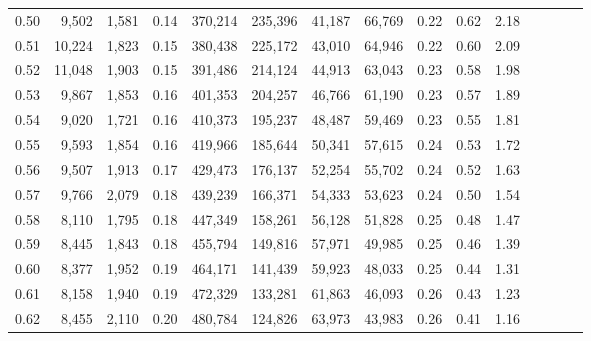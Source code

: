 \begin{tabular}{rrrcrrrrrrrrrrr}
0.50 &   9,502 &  1,581 &                                       0.14 &  370,214 &  235,396 &   41,187 &   66,769 &  0.22 &  0.62 &                         2.18 \\
0.51 &  10,224 &  1,823 &                                       0.15 &  380,438 &  225,172 &   43,010 &   64,946 &  0.22 &  0.60 &                         2.09 \\
0.52 &  11,048 &  1,903 &                                       0.15 &  391,486 &  214,124 &   44,913 &   63,043 &  0.23 &  0.58 &                         1.98 \\
0.53 &   9,867 &  1,853 &                                       0.16 &  401,353 &  204,257 &   46,766 &   61,190 &  0.23 &  0.57 &                         1.89 \\
0.54 &   9,020 &  1,721 &                                       0.16 &  410,373 &  195,237 &   48,487 &   59,469 &  0.23 &  0.55 &                         1.81 \\
0.55 &   9,593 &  1,854 &                                       0.16 &  419,966 &  185,644 &   50,341 &   57,615 &  0.24 &  0.53 &                         1.72 \\
0.56 &   9,507 &  1,913 &                                       0.17 &  429,473 &  176,137 &   52,254 &   55,702 &  0.24 &  0.52 &                         1.63 \\
0.57 &   9,766 &  2,079 &                                       0.18 &  439,239 &  166,371 &   54,333 &   53,623 &  0.24 &  0.50 &                         1.54 \\
0.58 &   8,110 &  1,795 &                                       0.18 &  447,349 &  158,261 &   56,128 &   51,828 &  0.25 &  0.48 &                         1.47 \\
0.59 &   8,445 &  1,843 &                                       0.18 &  455,794 &  149,816 &   57,971 &   49,985 &  0.25 &  0.46 &                         1.39 \\
0.60 &   8,377 &  1,952 &                                       0.19 &  464,171 &  141,439 &   59,923 &   48,033 &  0.25 &  0.44 &                         1.31 \\
0.61 &   8,158 &  1,940 &                                       0.19 &  472,329 &  133,281 &   61,863 &   46,093 &  0.26 &  0.43 &                         1.23 \\
0.62 &   8,455 &  2,110 &                                       0.20 &  480,784 &  124,826 &   63,973 &   43,983 &  0.26 &  0.41 &                         1.16 \\

\end{tabular}
